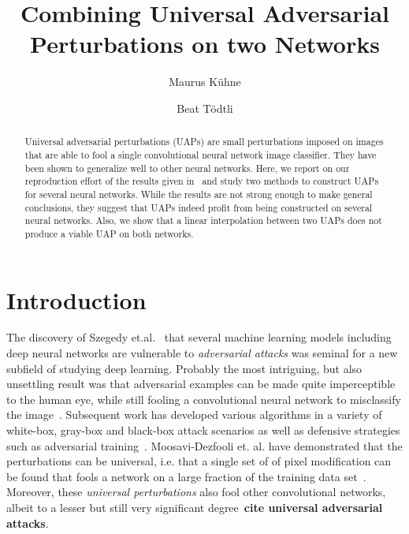 \documentclass[runningheads]{llncs}
\begin{document}
%
\title{Combining Universal Adversarial Perturbations on two Networks}%
%
%
\author{Maurus K\"uhne \and
Beat Tödtli} %
%
%
%
\maketitle              %
%
\begin{abstract}
Universal adversarial perturbations (UAPs) are small perturbations imposed on images that are able to fool a single convolutional neural network image classifier. They have been shown to generalize well to other neural networks. Here, we report on our reproduction effort of the results given in~\cite{moosavi-dezfooli_universal_2017} and study two methods to construct UAPs for several neural networks. While the results are not strong enough to make general conclusions, they suggest that UAPs indeed profit from being constructed on several neural networks. Also, we show that a linear interpolation between two UAPs does not produce a viable UAP on both networks.
\end{abstract}
%
%
%

\section{Introduction}
The discovery of Szegedy et.al.~\cite{Szegedy_2014} that several machine learning models including deep neural networks are vulnerable to \emph{adversarial attacks} was seminal for a new subfield of studying deep learning. Probably the most intriguing, but also unsettling result was that adversarial examples can be made quite imperceptible to the human eye, while still fooling a convolutional neural network to misclassify the image~\cite{goodfellow_2014}. Subsequent work has developed various algorithms in a variety of white-box, gray-box and black-box attack scenarios as well as defensive strategies such as adversarial training~\cite{REN2020346}. Moosavi-Dezfooli et. al. have demonstrated that the perturbations can be universal, i.e. that a single set of of pixel modification can be found that fools a network on a large fraction of the training data set~\cite{moosavi-dezfooli_universal_2017}. Moreover, these \emph{universal perturbations} also fool other convolutional networks, albeit to a lesser but still very significant degree~{\bf cite universal adversarial attacks}. 
\end{document}
